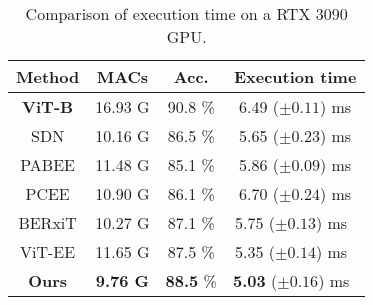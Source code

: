 \begin{table}[!t]
  \centering
  \setlength{\extrarowheight}{0pt}
  \addtolength{\extrarowheight}{\aboverulesep}
  \addtolength{\extrarowheight}{\belowrulesep}
  \setlength{\aboverulesep}{0pt}
  \setlength{\belowrulesep}{0pt}
  \caption{Comparison of execution time on a RTX 3090 GPU.}
  \label{tb:time}
  \vspace{-6pt}
  \begin{tabular}{cccc} 
  \toprule
  \textbf{Method}                                 & \textbf{MACs}   & \textbf{Acc.}     & \textbf{Execution time}         \\ 
  \hline
  \textbf{ViT-B}                                  & 16.93 G         & 90.8 \%           & 6.49 ($\pm0.11$) ms            \\
  SDN                                             & 10.16 G         & 86.5 \%           & 5.65 ($\pm0.23$) ms            \\
  PABEE                                           & 11.48 G         & 85.1 \%           & 5.86 ($\pm0.09$) ms            \\
  PCEE                                            & 10.90 G         & 86.1 \%           & 6.70 ($\pm0.24$) ms            \\
  BERxiT                                          & 10.27 G         & 87.1 \%           & 5.75 ($\pm0.13$) ms~           \\
  ViT-EE                                          & 11.65 G         & 87.5 \%          & 5.35 ($\pm0.14$) ms~           \\
  \rowcolor[rgb]{0.949,0.949,0.949} \textbf{Ours} & \textbf{9.76 G} & \textbf{88.5} \% & \textbf{5.03} ($\pm0.16$) ms~  \\
  \bottomrule
  \end{tabular}
  \vspace{-5pt}
  \end{table}


